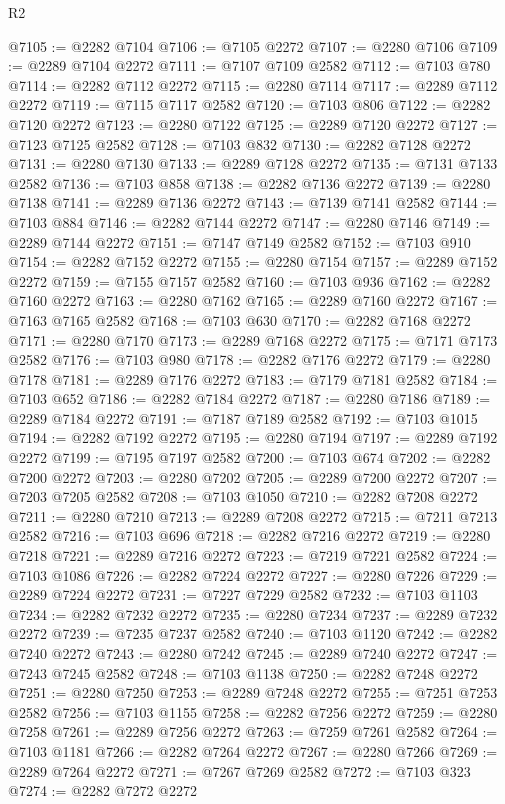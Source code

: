 \begin{lexlean}{R2}
\begin{coremodule}
@7105 := @2282 @7104
@7106 := @7105 @2272
@7107 := @2280 @7106
@7109 := @2289 @7104 @2272
@7111 := @7107 @7109 @2582
@7112 := @7103 @780
@7114 := @2282 @7112 @2272
@7115 := @2280 @7114
@7117 := @2289 @7112 @2272
@7119 := @7115 @7117 @2582
@7120 := @7103 @806
@7122 := @2282 @7120 @2272
@7123 := @2280 @7122
@7125 := @2289 @7120 @2272
@7127 := @7123 @7125 @2582
@7128 := @7103 @832
@7130 := @2282 @7128 @2272
@7131 := @2280 @7130
@7133 := @2289 @7128 @2272
@7135 := @7131 @7133 @2582
@7136 := @7103 @858
@7138 := @2282 @7136 @2272
@7139 := @2280 @7138
@7141 := @2289 @7136 @2272
@7143 := @7139 @7141 @2582
@7144 := @7103 @884
@7146 := @2282 @7144 @2272
@7147 := @2280 @7146
@7149 := @2289 @7144 @2272
@7151 := @7147 @7149 @2582
@7152 := @7103 @910
@7154 := @2282 @7152 @2272
@7155 := @2280 @7154
@7157 := @2289 @7152 @2272
@7159 := @7155 @7157 @2582
@7160 := @7103 @936
@7162 := @2282 @7160 @2272
@7163 := @2280 @7162
@7165 := @2289 @7160 @2272
@7167 := @7163 @7165 @2582
@7168 := @7103 @630
@7170 := @2282 @7168 @2272
@7171 := @2280 @7170
@7173 := @2289 @7168 @2272
@7175 := @7171 @7173 @2582
@7176 := @7103 @980
@7178 := @2282 @7176 @2272
@7179 := @2280 @7178
@7181 := @2289 @7176 @2272
@7183 := @7179 @7181 @2582
@7184 := @7103 @652
@7186 := @2282 @7184 @2272
@7187 := @2280 @7186
@7189 := @2289 @7184 @2272
@7191 := @7187 @7189 @2582
@7192 := @7103 @1015
@7194 := @2282 @7192 @2272
@7195 := @2280 @7194
@7197 := @2289 @7192 @2272
@7199 := @7195 @7197 @2582
@7200 := @7103 @674
@7202 := @2282 @7200 @2272
@7203 := @2280 @7202
@7205 := @2289 @7200 @2272
@7207 := @7203 @7205 @2582
@7208 := @7103 @1050
@7210 := @2282 @7208 @2272
@7211 := @2280 @7210
@7213 := @2289 @7208 @2272
@7215 := @7211 @7213 @2582
@7216 := @7103 @696
@7218 := @2282 @7216 @2272
@7219 := @2280 @7218
@7221 := @2289 @7216 @2272
@7223 := @7219 @7221 @2582
@7224 := @7103 @1086
@7226 := @2282 @7224 @2272
@7227 := @2280 @7226
@7229 := @2289 @7224 @2272
@7231 := @7227 @7229 @2582
@7232 := @7103 @1103
@7234 := @2282 @7232 @2272
@7235 := @2280 @7234
@7237 := @2289 @7232 @2272
@7239 := @7235 @7237 @2582
@7240 := @7103 @1120
@7242 := @2282 @7240 @2272
@7243 := @2280 @7242
@7245 := @2289 @7240 @2272
@7247 := @7243 @7245 @2582
@7248 := @7103 @1138
@7250 := @2282 @7248 @2272
@7251 := @2280 @7250
@7253 := @2289 @7248 @2272
@7255 := @7251 @7253 @2582
@7256 := @7103 @1155
@7258 := @2282 @7256 @2272
@7259 := @2280 @7258
@7261 := @2289 @7256 @2272
@7263 := @7259 @7261 @2582
@7264 := @7103 @1181
@7266 := @2282 @7264 @2272
@7267 := @2280 @7266
@7269 := @2289 @7264 @2272
@7271 := @7267 @7269 @2582
@7272 := @7103 @323
@7274 := @2282 @7272 @2272

\end{coremodule}
\end{lexlean}
